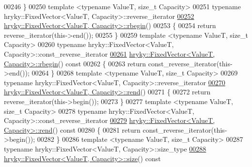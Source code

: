\begin{DoxyCode}
00246 \}
00250 \textcolor{keyword}{template} <\textcolor{keyword}{typename} ValueT, \textcolor{keywordtype}{size\_t} Capacity>
00251 \textcolor{keyword}{typename} hryky::FixedVector<ValueT, Capacity>::reverse\_iterator
\hypertarget{fixed__vector_8h_source_l00252}{}\hyperlink{classhryky_1_1_fixed_vector_a87885818e934930c46340007d4be8fff}{00252} \hyperlink{classhryky_1_1_fixed_vector}{hryky::FixedVector<ValueT, Capacity>::rbegin}()
00253 \{
00254     \textcolor{keywordflow}{return} reverse\_iterator(this->end());
00255 \}
00259 \textcolor{keyword}{template} <\textcolor{keyword}{typename} ValueT, \textcolor{keywordtype}{size\_t} Capacity>
00260 \textcolor{keyword}{typename} hryky::FixedVector<ValueT, Capacity>::const\_reverse\_iterator
\hypertarget{fixed__vector_8h_source_l00261}{}\hyperlink{classhryky_1_1_fixed_vector_a03626d86b7c7a907ef8bc54042f9e2fb}{00261} \hyperlink{classhryky_1_1_fixed_vector}{hryky::FixedVector<ValueT, Capacity>::rbegin}()\textcolor{keyword}{ const}
00262 \textcolor{keyword}{}\{
00263     \textcolor{keywordflow}{return} const\_reverse\_iterator(this->end());
00264 \}
00268 \textcolor{keyword}{template} <\textcolor{keyword}{typename} ValueT, \textcolor{keywordtype}{size\_t} Capacity>
00269 \textcolor{keyword}{typename} hryky::FixedVector<ValueT, Capacity>::reverse\_iterator
\hypertarget{fixed__vector_8h_source_l00270}{}\hyperlink{classhryky_1_1_fixed_vector_ab032ea1f92c9b8dd29c1aeab6a4591ac}{00270} \hyperlink{classhryky_1_1_fixed_vector}{hryky::FixedVector<ValueT, Capacity>::rend}()
00271 \{
00272     \textcolor{keywordflow}{return} reverse\_iterator(this->begin());
00273 \}
00277 \textcolor{keyword}{template} <\textcolor{keyword}{typename} ValueT, \textcolor{keywordtype}{size\_t} Capacity>
00278 \textcolor{keyword}{typename} hryky::FixedVector<ValueT, Capacity>::const\_reverse\_iterator
\hypertarget{fixed__vector_8h_source_l00279}{}\hyperlink{classhryky_1_1_fixed_vector_af81ad25d79bc3d9a9f3655ced8d33d0d}{00279} \hyperlink{classhryky_1_1_fixed_vector}{hryky::FixedVector<ValueT, Capacity>::rend}()\textcolor{keyword}{ const}
00280 \textcolor{keyword}{}\{
00281     \textcolor{keywordflow}{return} const\_reverse\_iterator(this->begin());
00282 \}
00286 \textcolor{keyword}{template} <\textcolor{keyword}{typename} ValueT, \textcolor{keywordtype}{size\_t} Capacity>
00287 \textcolor{keyword}{typename} hryky::FixedVector<ValueT, Capacity>::size\_type
\hypertarget{fixed__vector_8h_source_l00288}{}\hyperlink{classhryky_1_1_fixed_vector_a5213839602f1eabaa2e8ad064407e6bc}{00288} \hyperlink{classhryky_1_1_fixed_vector}{hryky::FixedVector<ValueT, Capacity>::size}()\textcolor{keyword}{ const}

\end{DoxyCode}
